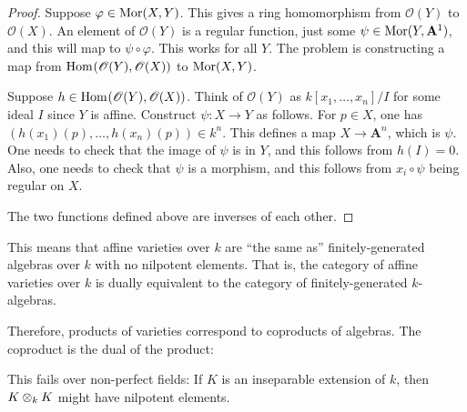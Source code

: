 \documentclass[11pt, oneside,margin=1in]{article}
\begin{document}
\begin{proof}
Suppose $\varphi \in \operatorname{Mor}(X,Y)$. This gives a ring homomorphism from $\mathscr{O}(Y) $ to $\mathscr{O}(X)$. An element of $\mathscr{O}(Y)$ is a regular function, just some $\psi\in \operatorname{Mor}(Y, \mathbf{A}^1)$, and this will map to $\psi\circ\varphi$. This works for all $Y$. The problem is constructing a map from $\operatorname{Hom}_{}(\mathscr{O}(Y), \mathscr{O}(X))$ to $\operatorname{Mor}(X,Y)$. 

Suppose $h\in \operatorname{Hom}_{}(\mathscr{O}(Y),\mathscr{O}(X) )$. Think of $\mathscr{O}(Y)$ as $k[x_1,\hdots, x_n]/I$ for some ideal $I$ since $Y$ is affine. Construct $\psi:X\longrightarrow Y$ as follows. For $p\in X$, one has $(h(x_1)(p),\hdots, h(x_n) (p))\in k^n$. This defines a map $X\longrightarrow \mathbf{A}^n$, which is $\psi$. One needs to check that the image of $\psi$ is in $Y$, and this follows from $h(I)=0$. Also, one needs to check that $\psi$ is a morphism, and this follows from $x_i\circ\psi$ being regular on $X$.

The two functions defined above are inverses of each other.
\end{proof}
\begin{remark}
This means that affine varieties over $k$ are ``the same as'' finitely-generated algebras over $k$ with no nilpotent elements. That is, the category of affine varieties over $k$ is dually equivalent to the category of finitely-generated $k$-algebras.

Therefore, products of varieties correspond to coproducts of algebras. The coproduct is the dual of the product:
\begin{center}
\end{center}
\end{remark}
\begin{warn}
	This fails over non-perfect fields: If $K$ is an inseparable extension of $k$, then $K\otimes_k K$ might have nilpotent elements. 
\end{warn}
\end{document}
